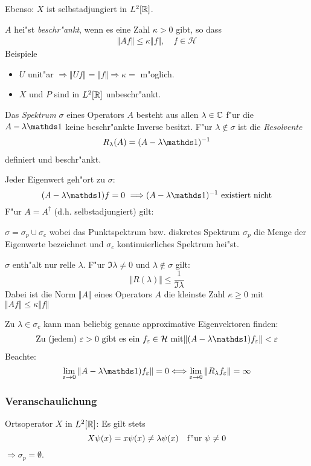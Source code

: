\documentclass[a4paper]{scrartcl}
\begin{document}
{Ebenso: $X$ ist selbstadjungiert in $L^2[\mathbb{R}]$.

$A$ hei"st \emph{beschr"ankt}, wenn es eine Zahl $\kappa > 0$ gibt, so dass
\begin{align}
\Vert A f \Vert \leq \kappa \Vert f \Vert, \quad f \in \mathcal H
\end{align}
Beispiele
\begin{itemize}
\item $U$ unit"ar $\Longrightarrow \Vert Uf \Vert = \Vert f \Vert \Rightarrow \kappa =$ m"oglich.
\item $X$ und $P$ sind in $L^2[\mathbb{R}]$ unbeschr"ankt.
\end{itemize}
Das \emph{Spektrum $\sigma$} eines Operators $A$ besteht aus allen $\lambda \in \mathbb{C}$ f"ur die $A - \lambda \dOne$ keine beschr"ankte Inverse besitzt. F"ur $\lambda \notin \sigma$ ist die \emph{Resolvente}
\begin{align}
R_\lambda(A) = (A - \lambda \dOne)^{-1}
\end{align}
definiert und beschr"ankt.

Jeder Eigenwert geh"ort zu $\sigma$:
$$(A-\lambda \dOne) f = 0 \ \Longrightarrow (A-\lambda \dOne)^{-1} \mathrm{ \ existiert \ nicht}$$
F"ur $A = A^\dagger$ (d.h. selbstadjungiert) gilt:
\begin{1aufz}
\item $\sigma = \sigma_p \cup \sigma_c$ wobei das Punktspektrum bzw. diskretes Spektrum $\sigma_p$ die Menge der Eigenwerte bezeichnet und $\sigma_c$ kontinuierliches Spektrum hei"st.
\item $\sigma$ enth"alt nur relle $\lambda$. F"ur $\Im \lambda \neq 0$ und $\lambda \notin \sigma$ gilt:
$$\Vert R(\lambda) \Vert \leq \frac 1 {\Im \lambda}$$
Dabei ist die Norm $\Vert A \Vert$ eines Operators $A$ die kleinste Zahl $\kappa \geq 0$ mit $\Vert Af \Vert \leq \kappa \Vert f \Vert$
\item Zu $\lambda \in \sigma_c$ kann man beliebig genaue approximative Eigenvektoren finden:
\begin{align}
\mathrm{Zu \ (jedem) \ } \eps>0 \mathrm{ \ gibt \ es \ ein \ } f_\eps \in \mathcal H \mathrm{ \ mit } \Vert (A-\lambda\dOne) f_\eps \Vert < \eps
\end{align}
Beachte:
$$\lim_{\eps \rightarrow 0} \Vert A - \lambda \dOne) f_\eps \Vert = 0 \Longleftrightarrow \lim_{\eps \rightarrow 0} \Vert R_\lambda f_\eps \Vert = \infty$$
\end{1aufz}

\subsubsection*{Veranschaulichung}
\begin{1aufz}
\item Ortsoperator $X$ in $L^2[\mathbb{R}]$: Es gilt stets
$$ X \psi(x) = x \psi(x) \neq \lambda \psi(x) \quad \mathrm{f"ur \ } \psi \neq 0$$
$\Longrightarrow \sigma_p = \emptyset$.


\end{1aufz}}
\end{document}
